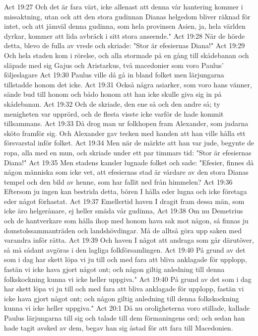 Act 19:27  Och det är fara värt, icke allenast att denna vår hantering kommer i missaktning, utan ock att den stora gudinnan Dianas helgedom bliver räknad för intet, och att jämväl denna gudinna, som hela provinsen Asien, ja, hela världen dyrkar, kommer att lida avbräck i sitt stora anseende."
Act 19:28  När de hörde detta, blevo de fulla av vrede och skriade: "Stor är efesiernas Diana!"
Act 19:29  Och hela staden kom i rörelse, och alla stormade på en gång till skådebanan och släpade med sig Gajus och Aristarkus, två macedonier som voro Paulus' följeslagare
Act 19:30  Paulus ville då gå in bland folket men lärjungarna tillstadde honom det icke.
Act 19:31  Också några asiarker, som voro hans vänner, sände bud till honom och bådo honom att han icke skulle giva sig in på skådebanan.
Act 19:32  Och de skriade, den ene så och den andre så; ty menigheten var upprörd, och de flesta visste icke varför de hade kommit tillsammans.
Act 19:33  Då drog man ur folkhopen fram Alexander, som judarna sköto framför sig. Och Alexander gav tecken med handen att han ville hålla ett försvarstal inför folket.
Act 19:34  Men när de märkte att han var jude, begynte de ropa, alla med en mun, och skriade under ett par timmars tid: "Stor är efesiernas Diana!"
Act 19:35  Men stadens kansler lugnade folket och sade: "Efesier, finnes då någon människa som icke vet, att efesiernas stad är vårdare av den stora Dianas tempel och den bild av henne, som har fallit ned från himmelen?
Act 19:36  Eftersom ju ingen kan bestrida detta, bören I hålla eder lugna och icke företaga eder något förhastat.
Act 19:37  Emellertid haven I dragit fram dessa män, som icke äro helgerånare, ej heller smäda vår gudinna,
Act 19:38  Om nu Demetrius och de hantverkare som hålla ihop med honom hava sak mot någon, så finnas ju domstolssammanträden och landshövdingar. Må de alltså göra upp saken med varandra inför rätta.
Act 19:39  Och haven I något att andraga som går därutöver, så må sådant avgöras i den lagliga folkförsamlingen.
Act 19:40  På grund av det som i dag har skett löpa vi ju till och med fara att bliva anklagade för upplopp, fastän vi icke hava gjort något ont; och någon giltig anledning till denna folkskockning kunna vi icke heller uppgiva."
Act 19:40  På grund av det som i dag har skett löpa vi ju till och med fara att bliva anklagade för upplopp, fastän vi icke hava gjort något ont; och någon giltig anledning till denna folkskockning kunna vi icke heller uppgiva."
Act 20:1  Då nu oroligheterna voro stillade, kallade Paulus lärjungarna till sig och talade till dem förmaningens ord; och sedan han hade tagit avsked av dem, begav han sig åstad för att fara till Macedonien.
